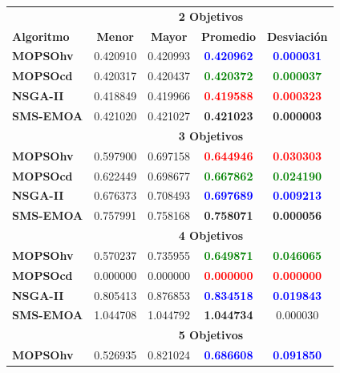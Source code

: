 \begin{longtable}{|l|cc|cc|} 
\hline
    & \multicolumn{4}{|c|}{\textbf{2 Objetivos}} \\ 
	\textbf{Algoritmo} & \textbf{Menor} & \textbf{Mayor} & \textbf{Promedio} & \textbf{Desviaci\'on} \\  \hline \hline
	\textbf{MOPSOhv} & 0.420910 & 0.420993 & \textbf{\textcolor{blue}{0.420962}} &\textbf{\textcolor{blue}{ 0.000031}}\\ 
	\textbf{MOPSOcd} & 0.420317 & 0.420437 & \textbf{\textcolor{green}{0.420372}} &\textbf{\textcolor{green}{ 0.000037}}\\ 
	\textbf{NSGA-II} & 0.418849 & 0.419966 & \textbf{\textcolor{red}{0.419588}} &\textbf{\textcolor{red}{ 0.000323}}\\  
	\textbf{SMS-EMOA}& 0.421020 & 0.421027 & \textbf{0.421023} & \textbf{0.000003}\\  
	\hline\hline
    & \multicolumn{4}{|c|}{\textbf{3  Objetivos}} \\ 
	\hline\hline
	\textbf{MOPSOhv} & 0.597900 & 0.697158 & \textbf{\textcolor{red}{0.644946}} & \textbf{\textcolor{red}{0.030303}}\\ 
	\textbf{MOPSOcd} & 0.622449 & 0.698677 & \textbf{\textcolor{green}{0.667862}} & \textbf{\textcolor{green}{0.024190}}\\ 
	\textbf{NSGA-II} & 0.676373 & 0.708493 & \textbf{\textcolor{blue}{0.697689}} & \textbf{\textcolor{blue}{0.009213}}\\  
	\textbf{SMS-EMOA}& 0.757991 & 0.758168 & \textbf{0.758071} & \textbf{0.000056}\\
	\hline\hline
    & \multicolumn{4}{|c|}{\textbf{4 Objetivos}} \\ 
	\hline\hline
	\textbf{MOPSOhv} &0.570237 & 0.735955 & \textbf{\textcolor{green}{0.649871}} & \textbf{\textcolor{green}{0.046065}} \\ 
	\textbf{MOPSOcd} &0.000000 & 0.000000 & \textbf{\textcolor{red}{0.000000}} & \textbf{\textcolor{red}{0.000000}} \\ 
	\textbf{NSGA-II} &0.805413 & 0.876853 & \textbf{\textcolor{blue}{0.834518}} & \textbf{\textcolor{blue}{0.019843}} \\  
	\textbf{SMS-EMOA}&1.044708 & 1.044792 & \textbf{1.044734} & 0.000030 \\ 
	\hline\hline
 & \multicolumn{4}{|c|}{\textbf{5 Objetivos}} \\ 
	\hline\hline
	\textbf{MOPSOhv} &0.526935 & 0.821024 & \textbf{\textcolor{blue}{0.686608}} & \textbf{\textcolor{blue}{0.091850}} \\ 

\end{longtable}
